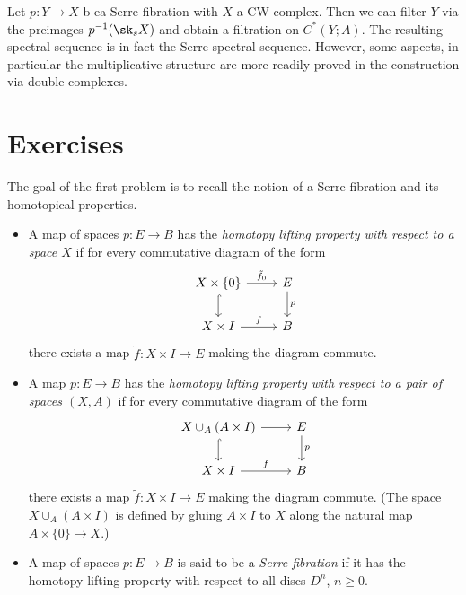 \documentclass[wip, topology]{bsteffan-lecturenotes}
\begin{document}
\begin{example}
	Let $p\colon Y \to X$ b ea Serre fibration with $X$ a CW-complex.
	Then we can filter $Y$ via the preimages $p^{-1}(\sk_s X)$ and obtain a filtration on $C^*(Y; A)$.
	The resulting spectral sequence is in fact the Serre spectral sequence.
	However, some aspects, in particular the multiplicative structure are more readily proved in the construction via double complexes.
\end{example}

\section{Exercises}
\begin{exercise}\label{ex:serrefib}
	The goal of the first problem is to recall the notion of a Serre fibration and its homotopical properties.
	\begin{itemize}
		\item A map of spaces $p\colon E \to B$ has the \emph{homotopy lifting property with respect to a space $X$} if for every commutative diagram of the form
			\begin{equation*}
				\begin{tikzcd}
					X \times \{0\} 
							\ar[r, "\tilde{f}_0"]
							\ar[d, hook]
						& E
							\ar[d, "p"]
					\\
					X \times I
							\ar[r, "f"]
						& B
				\end{tikzcd}
			\end{equation*}
			there exists a map $\tilde{f}\colon X \times I \to E$ making the diagram commute.
		\item A map $p\colon E \to B$ has the \emph{homotopy lifting property with respect to a pair of spaces $(X, A)$} if for every commutative diagram of the form
			\begin{equation*}
				\begin{tikzcd}
					X \cup_A (A \times I)
							\ar[r]
							\ar[d, hook]
						& E
							\ar[d, "p"]
					\\
					X \times I
							\ar[r, "f"]
						& B
				\end{tikzcd}
			\end{equation*}
			there exists a map $\tilde{f}\colon X \times I \to E$ making the diagram commute. (The space $X \cup_A (A \times I)$ is defined by gluing $A \times I$ to $X$ along the natural map $A \times \{0\} \to X$.)
		\item A map of spaces $p\colon E \to B$ is said to be a \emph{Serre fibration} if it has the homotopy lifting property with respect to all discs $D^n$, $n \geq 0$.

\end{itemize}
\end{exercise}
\end{document}
